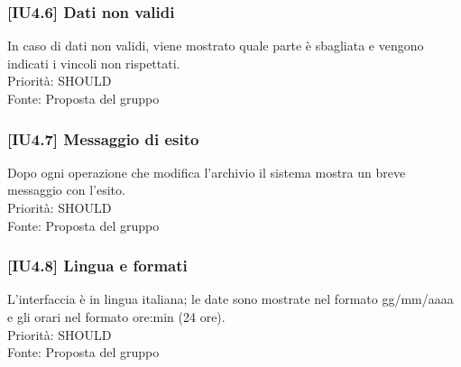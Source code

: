 \subsubsection{[IU4.6] Dati non validi}
In caso di dati non validi, viene mostrato quale parte è sbagliata e vengono indicati i vincoli non rispettati.\\
Priorità: SHOULD\\Fonte: Proposta del gruppo

\subsubsection{[IU4.7] Messaggio di esito}
Dopo ogni operazione che modifica l'archivio il sistema mostra un breve messaggio con l'esito.\\
Priorità: SHOULD\\Fonte: Proposta del gruppo

\subsubsection{[IU4.8] Lingua e formati}
L'interfaccia è in lingua italiana; le date sono mostrate nel formato gg/mm/aaaa e gli orari nel formato ore:min (24 ore).\\
Priorità: SHOULD\\Fonte: Proposta del gruppo
